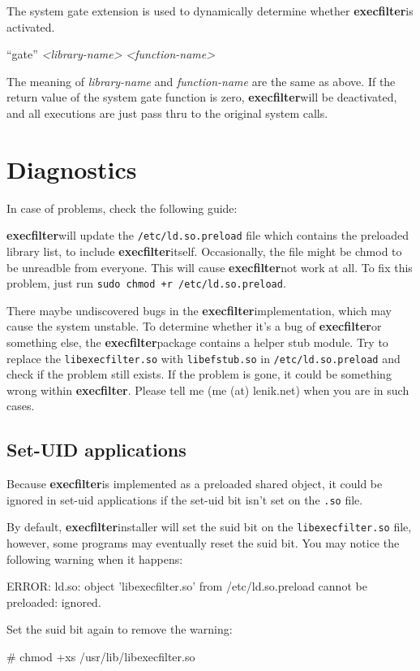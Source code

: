 \documentclass[hyperref, bookmark]{z-article}
\newcommand\code[1]{\texttt{#1}}
\newcommand\syntax[1]{
  \begin{mdframed}[
      linecolor=brown,
      linewidth=2pt,
    ]
    #1
  \end{mdframed}
}
\newcommand\xfilt{\textbf{execfilter}}
\begin{document}
The system gate extension is used to dynamically determine whether \xfilt is
activated.

\syntax {
  ``gate''
  \textit{<library-name>}
  \textit{<function-name>}
}

The meaning of \textit{library-name} and \textit{function-name} are the same as
above. If the return value of the system gate function is zero, \xfilt will be
deactivated, and all executions are just pass thru to the original system calls.

\section {Diagnostics}

In case of problems, check the following guide:

\xfilt will update the \code{/etc/ld.so.preload} file which contains the
preloaded library list, to include \xfilt itself. Occasionally, the file might
be chmod to be unreadble from everyone.  This will cause \xfilt not work at
all. To fix this problem, just run \code{sudo chmod +r /etc/ld.so.preload}.

There maybe undiscovered bugs in the \xfilt implementation, which may cause the
system unstable.  To determine whether it's a bug of \xfilt or something else,
the \xfilt package contains a helper stub module.  Try to replace the
\code{libexecfilter.so} with \code{libefstub.so} in \code{/etc/ld.so.preload}
and check if the problem still exists.  If the problem is gone, it could be
something wrong within \xfilt.  Please tell me (me (at) lenik.net) when you are
in such cases.

\subsection {Set-UID applications}

Because \xfilt is implemented as a preloaded shared object, it could be ignored
in set-uid applications if the set-uid bit isn't set on the \code{.so} file.

By default, \xfilt installer will set the suid bit on the
\code{libexecfilter.so} file, however, some programs may eventually reset the
suid bit. You may notice the following warning when it happens:

\begin{console}
  ERROR: ld.so: object 'libexecfilter.so' from /etc/ld.so.preload
  cannot be preloaded: ignored.
\end{console}

Set the suid bit again to remove the warning:

\begin{console}
  # chmod +xs /usr/lib/libexecfilter.so
\end{console}

\appendix
\end{document}
